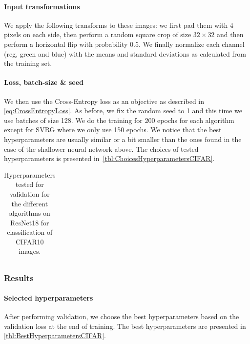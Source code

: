 \documentclass[a4paper,11pt,oneside]{report}
\begin{document}
\paragraph{Input transformations}
We apply the following transforms to these images: we first pad them with 4 pixels on each side, then perform a random square crop of size $32\times32$ and then perform a horizontal flip with probability $0.5$. We finally normalize each channel (reg, green and blue) with the means and standard deviations as calculated from the training set. 

\paragraph{Loss, batch-size \& seed}
We then use the Cross-Entropy loss as an objective as described in \autoref{eq:CrossEntropyLoss}. As before, we fix the random seed to 1 and this time we use batches of size 128. We do the training for 200 epochs for each algorithm except for SVRG where we only use 150 epochs. We notice that the best hyperparameters are usually similar or a bit smaller than the ones found in the case of the shallower neural network above. The choices of tested hyperparameters is presented in~\autoref{tbl:ChoicesHyperparametersCIFAR}.

\begin{table}
    \begin{center}
        \begin{tabular}{||c | c | l||}
             \hline
             
        \end{tabular}
    \end{center}
    \caption{Hyperparameters tested for validation for the different algorithms on ResNet18 for classification of CIFAR10 images.
    }
    \label{tbl:ChoicesHyperparametersCIFAR}
\end{table}

\subsubsection{Results}
\paragraph{Selected hyperparameters}
After performing validation, we choose the best hyperparameters based on the validation loss at the end of training. The best hyperparameters are presented in \autoref{tbl:BestHyperparametersCIFAR}.
\end{document}
